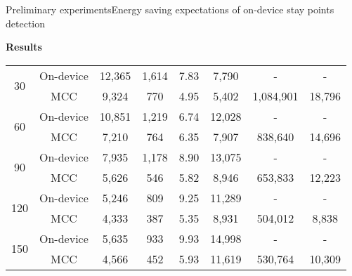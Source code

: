 \begin{frame}[noframenumbering]{Preliminary experiments}{Energy saving expectations of on-device stay points detection}
\begin{block}{\small \textbf{Results}}
{{\begin{tabular}{@{}cccccccc@{}}
\multirow{2}{*}{30}  & On-device   &  12,365 & 1,614 & 7.83  & 7,790 & - & - \\
                          & MCC &  9,324 &   770 & 4.95  & 5,402 & 1,084,901 & 18,796 \\
\cmidrule(l){2-8}
\multirow{2}{*}{60}  & On-device    & 10,851 & 1,219 & 6.74 & 12,028 & - & - \\
                          & MCC &  7,210 &   764 & 6.35 &  7,907 & 838,640 & 14,696 \\
\cmidrule(l){2-8}
\multirow{2}{*}{90}  & On-device    & 7,935 & 1,178 & 8.90 & 13,075 & - & - \\
                          & MCC & 5,626 &   546 & 5.82 &  8,946 & 653,833 & 12,223 \\
\cmidrule(l){2-8}
\multirow{2}{*}{120} & On-device    & 5,246 & 809 & 9.25 & 11,289 & - & - \\
                          & MCC & 4,333 & 387 & 5.35 &  8,931 & 504,012 & 8,838 \\
\cmidrule(l){2-8}
\multirow{2}{*}{150} & On-device    & 5,635 & 933 & 9.93 & 14,998 & - & - \\
                          & MCC & 4,566 & 452 & 5.93 & 11,619 & 530,764 & 10,309 \\
\bottomrule
\end{tabular}
}
\par }
\end{block}
\end{frame}


